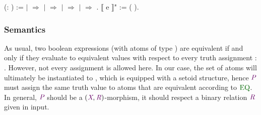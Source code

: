 \begin{coqdoccode}
\coqdocnoindent
{}  (: ) :=   \coqdoceol
\coqdocindent{1.00em}
\ensuremath{|}   \ensuremath{\Rightarrow} \coqdoceol
\coqdocindent{1.00em}
\ensuremath{|}  \ensuremath{\Rightarrow} \coqdoceol
\coqdocindent{1.00em}
\ensuremath{|}   \ensuremath{\Rightarrow}   \coqdoceol
\coqdocindent{1.00em}
\ensuremath{|}    \ensuremath{\Rightarrow}     \coqdoceol
\coqdocnoindent
{}.\coqdoceol
\coqdocnoindent
{} ⟦ e ⟧" := ( ).\coqdoceol
\coqdocemptyline
\end{coqdoccode}


\subsubsection{Semantics}

As usual, two boolean expressions (with atoms of type ) are equivalent if and only if 
they evaluate to equivalent values with respect to every
truth assignment :  \coqdocnotation{\ensuremath{\rightarrow}} . However, not every assignment is allowed here.
In our case, the set of atoms  will ultimately be instantiated to , which is equipped with a setoid structure, hence $\coqdocvar{P}$ must assign the same truth value to atoms that are equivalent according to $\coqdocdefinition{EQ}$. In general, $\coqdocvar{P}$ should be a $(\coqdocvariable{X}, \coqdocvar{R})$-morphism, \ie{} it should respect a binary relation $\coqdocvar{R}$ given in input.

